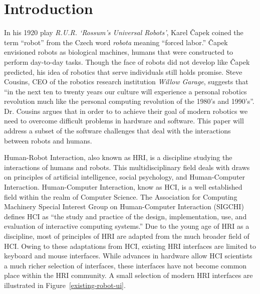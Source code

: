 \chapter{Introduction}

In his 1920 play \emph{R.U.R. ‘Rossum's Universal Robots’}, Karel Čapek coined the term ``robot'' from the Czech word \emph{robota} meaning ``forced labor.'' Čapek envisioned robots as biological machines, humans that were constructed to perform day-to-day tasks. Though the face of robots did not develop like Čapek predicted, his idea of robotics that serve individuals still holds promise. Steve Cousins, CEO of the robotics research institution \emph{Willow Garage}, suggests that ``in the next ten to twenty years our culture will experience a personal robotics revolution much like the personal computing revolution of the 1980's and 1990's''. \cite{Cousins} Dr. Cousins argues that in order to to achieve their goal of modern robotics we need to overcome difficult problems in hardware and software. This paper will address a subset of the software challenges that deal with the interactions between robots and humans.

Human-Robot Interaction, also known as HRI, is a discipline studying the interactions of humans and robots. This multidisciplinary field deals with draws on principles of artificial intelligence, social psychology, and Human-Computer Interaction. Human-Computer Interaction, know as HCI, is a well established field within the realm of Computer Science. The Association for Computing Machinery Special Interest Group on Human-Computer Interaction (SIGCHI) defines HCI as ``the study and practice of the design, implementation, use, and evaluation of interactive computing systems.'' \cite{SIGCHI} Due to the young age of HRI as a discipline, most of principles of HRI are adapted from the much broader field of HCI. Owing to these adaptations from HCI, existing HRI interfaces are limited to keyboard and mouse interfaces. While advances in hardware allow HCI scientists a much richer selection of interfaces, these interfaces have not become common place within the HRI community. A small selection of modern HRI interfaces are illustrated in Figure~\ref{existing-robot-ui}.

